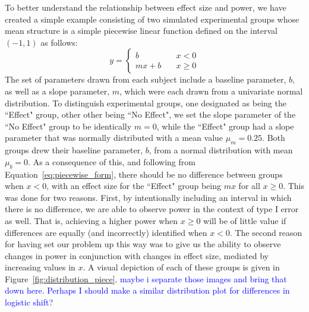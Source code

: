 \documentclass{article}
\providecommand{\cn}[1]{\textcolor{blue}{#1}}
\begin{document}
To better understand the relationship between effect size and power, we have created a simple example consisting of two simulated experimental groups whose mean structure is a simple piecewise linear function defined on the interval $(-1, 1)$ as follows:
\begin{equation}\label{eq:piecewise_form}
y = \begin{cases}
b \quad &x < 0 \\
mx + b \quad &x \geq 0
\end{cases}
\end{equation}
The set of parameters drawn from each subject include a baseline parameter, $b$, as well as a slope parameter, $m$, which were each drawn from a univariate normal distribution. To distinguish experimental groups, one designated as being the ``Effect" group, other other being ``No Effect", we set the slope parameter of the ``No Effect" group to be identically $m = 0$, while the ``Effect" group had a slope parameter that was normally distributed with a mean value $\mu_m = 0.25$. Both groups drew their baseline parameter, $b$, from a normal distribution with mean $\mu_b = 0$. As a consequence of this, and following from Equation~\ref{eq:piecewise_form}, there should be no difference between groups when $x < 0$, with an effect size for the ``Effect" group being $mx$ for all $x \geq 0$. This was done for two reasons. First, by intentionally including an interval in which there is no difference, we are able to observe power in the context of type I error as well. That is, achieving a higher power when $x \geq 0$ will be of little value if differences are equally (and incorrectly) identified when $x < 0$. The second reason for having set our problem up this way was to give us the ability to observe changes in power in conjunction with changes in effect size, mediated by increasing values in $x$. A visual depiction of each of these groups is given in Figure~\ref{fig:distribution_piece}. \cn{maybe i separate those images and bring that down here. Perhaps I should make a similar distribution plot for differences in logistic shift?}
\end{document}
